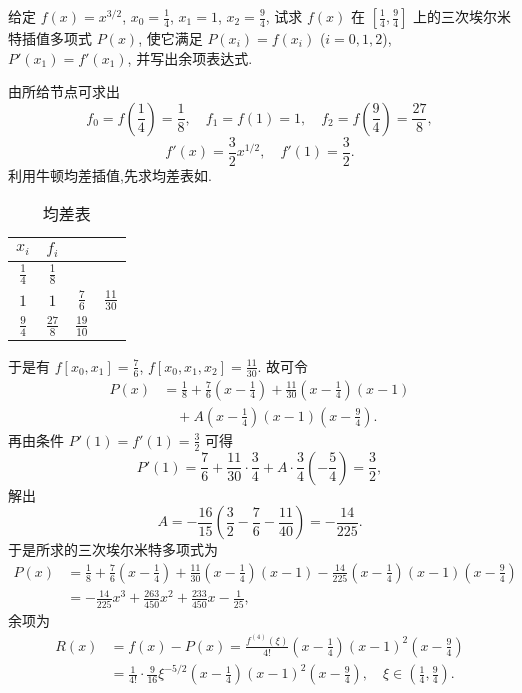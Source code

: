 \documentclass[../../main.tex]{subfiles}
\begin{document}
\begin{example}
给定 $f(x) = x^{3/2}$, $x_0 = \frac{1}{4}$, $x_1 = 1$, $x_2 = \frac{9}{4}$, 试求 $f(x)$ 在 $\left[ \frac{1}{4}, \frac{9}{4} \right]$ 上的三次埃尔米特插值多项式 $P(x)$, 使它满足 $P(x_i) = f(x_i)$ ($i = 0, 1, 2$), $P'(x_1) = f'(x_1)$, 并写出余项表达式.
\end{example}
\begin{solution}
由所给节点可求出
\[
f_0 = f\left( \frac{1}{4} \right) = \frac{1}{8}, \quad f_1 = f(1) = 1, \quad f_2 = f\left( \frac{9}{4} \right) = \frac{27}{8},
\]
\[
f'(x) = \frac{3}{2} x^{1/2}, \quad f'(1) = \frac{3}{2}.
\]
利用牛顿均差插值,先求均差表如.
\begin{table}[H]
\centering
\caption{均差表}
\label{table:均差表111}
\begin{tabular}{c c c c}
\toprule
$x_i$ & $f_i$ &  &  \\
\midrule
$\frac{1}{4}$ & $\frac{1}{8}$ &  &  \\
$1$ & $1$ & $\frac{7}{6}$ & $\frac{11}{30}$ \\
$\frac{9}{4}$ & $\frac{27}{8}$ & $\frac{19}{10}$ &  \\
\bottomrule
\end{tabular}
\end{table}

于是有 $f[x_0, x_1] = \frac{7}{6}$, $f[x_0, x_1, x_2] = \frac{11}{30}$.
故可令
\begin{align*}
P(x) &= \frac{1}{8} + \frac{7}{6} \left( x - \frac{1}{4} \right) + \frac{11}{30} \left( x - \frac{1}{4} \right)(x - 1) \\
&\quad + A \left( x - \frac{1}{4} \right)(x - 1) \left( x - \frac{9}{4} \right).
\end{align*}
再由条件 $P'(1) = f'(1) = \frac{3}{2}$ 可得
\[
P'(1) = \frac{7}{6} + \frac{11}{30} \cdot \frac{3}{4} + A \cdot \frac{3}{4} \left( -\frac{5}{4} \right) = \frac{3}{2},
\]
解出
\[
A = -\frac{16}{15} \left( \frac{3}{2} - \frac{7}{6} - \frac{11}{40} \right) = -\frac{14}{225}.
\]
于是所求的三次埃尔米特多项式为
\begin{align*}
P(x) &= \frac{1}{8} + \frac{7}{6} \left( x - \frac{1}{4} \right) + \frac{11}{30} \left( x - \frac{1}{4} \right)(x - 1) - \frac{14}{225} \left( x - \frac{1}{4} \right)(x - 1) \left( x - \frac{9}{4} \right) \\
&= -\frac{14}{225} x^3 + \frac{263}{450} x^2 + \frac{233}{450} x - \frac{1}{25},
\end{align*}
余项为
\begin{align*}
R(x) &= f(x) - P(x) = \frac{f^{(4)}(\xi)}{4!} \left( x - \frac{1}{4} \right)(x - 1)^2 \left( x - \frac{9}{4} \right) \\
&= \frac{1}{4!} \cdot \frac{9}{16} \xi^{-5/2} \left( x - \frac{1}{4} \right)(x - 1)^2 \left( x - \frac{9}{4} \right), \quad \xi \in \left( \frac{1}{4}, \frac{9}{4} \right).
\end{align*}
\end{solution}
\end{document}
